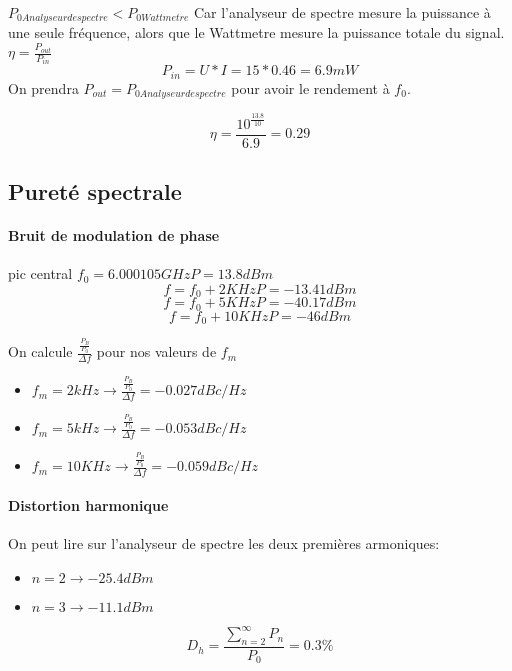 \documentclass[oneside,a4paper,12pt]{article}
\begin{document}
	$ P_{0 Analyseur de spectre} < P_{0 Wattmetre} $ Car l'analyseur de spectre mesure la puissance à une seule fréquence, alors que le Wattmetre mesure la puissance totale du signal.\\

	$ \eta = \frac{P_{out}}{P_{in}} $
	\[ P_{in} = U*I = 15*0.46 = 6.9mW \]
	On prendra $P_{out} = P_{0 Analyseur de spectre} $ pour avoir le rendement à $ f_{0} $.

	\[ \eta = \frac{10^{\frac{13.8}{10}}}{6.9} = 0.29 \]

	\subsection{Pureté spectrale}

	\paragraph*{Bruit de modulation de phase}

	pic central $ f_{0} = 6.000105 GHz P = 13.8 dBm $\\
	\[ f = f_{0} + 2KHz P = -13.41 dBm \]
	\[ f = f_{0} + 5KHz P = -40.17 dBm \]
	\[ f = f_{0} + 10KHz P = -46 dBm \]

	On calcule $ \frac{\frac{P_{B}}{P_{0}}}{\Delta f} $ pour nos valeurs de $ f_{m} $
	\begin{itemize}
		\item $ f_{m} = 2kHz \rightarrow \frac{\frac{P_{B}}{P_{0}}}{\Delta f} = -0.027 dBc/Hz $ 
		\item $ f_{m} = 5kHz \rightarrow \frac{\frac{P_{B}}{P_{0}}}{\Delta f} = -0.053 dBc/Hz $
		\item $ f_{m} = 10KHz \rightarrow \frac{\frac{P_{B}}{P_{0}}}{\Delta f} = -0.059 dBc/Hz $
	\end{itemize}

	\paragraph*{Distortion harmonique}

	On peut lire sur l'analyseur de spectre les deux premières armoniques:
	\begin{itemize}
		\item $ n = 2 \rightarrow -25.4 dBm $
		\item $ n = 3 \rightarrow -11.1 dBm $
	\end{itemize}
	\[ D_{h} = \frac{\sum_{n = 2}^{\infty} P_{n}}{P_{0}} = 0.3 \% \]
\end{document}
